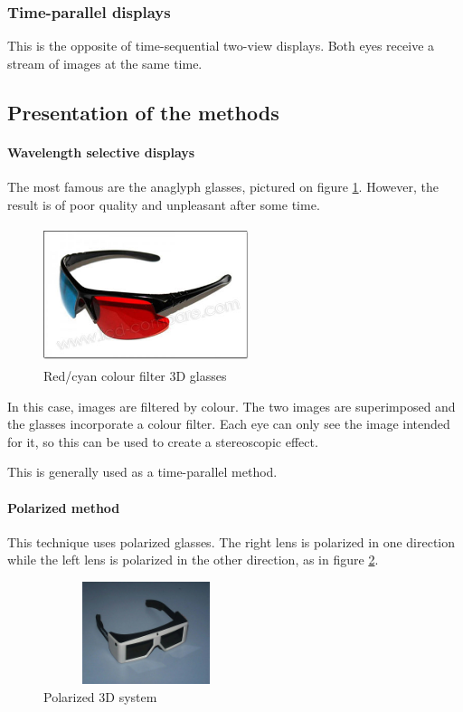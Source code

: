 \subsubsection{Time-parallel displays}
This is the opposite of time-sequential two-view displays. Both eyes receive a stream of images at the same time.

\subsection{Presentation of the methods}
\paragraph{Wavelength selective displays}
The most famous are the anaglyph glasses, pictured on figure \ref{fig:anaglass}. However, the result is of poor quality and unpleasant after some time.

\begin{figure}[h!]
\centering
\centering\includegraphics[width=6cm,height=40mm]{image/1.jpg}
\caption{Red/cyan colour filter 3D glasses}
\label{fig:anaglass}
\end{figure}

In this case, images are filtered by colour. The two images are superimposed and the glasses incorporate a colour filter. Each eye can only see the image intended for it, so this can be used to create a stereoscopic effect. 

This is generally used as a time-parallel method.

\paragraph{Polarized method}
\label{par:polarized}
This technique uses polarized glasses. The right lens is polarized in one direction while the left lens is polarized in the other direction, as in figure \ref{fig:polarized3D}. 

\begin{figure}[h!]
\begin{center}
\begin{minipage}{1\linewidth}
\centering\includegraphics[width=6cm,height=30mm]{image/2.jpg}
\caption{Polarized 3D system}
\label{fig:polarized3D}
\end{minipage}
\end{center}
\end{figure}

